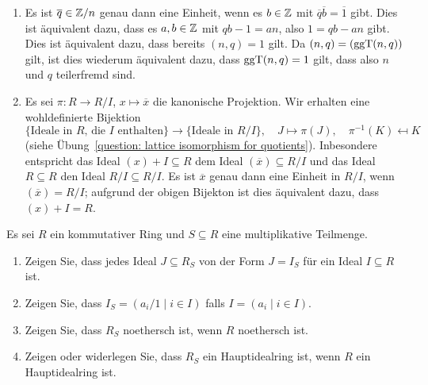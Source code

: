 \begin{solution}
  \begin{enumerate}
    \item 
      Es ist $\overline{q} \in \mathbb{Z}/n$ genau dann eine Einheit, wenn es $b \in \mathbb{Z}$ mit $\overline{q} \overline{b} = \overline{1}$ gibt.
      Dies ist äquivalent dazu, dass es $a, b \in \mathbb{Z}$ mit $qb - 1 = an$, also $1 = qb - an$ gibt.
      Dies ist äquivalent dazu, dass bereits $(n,q) = 1$ gilt.
      Da $(n,q) = (\operatorname{ggT}(n,q))$ gilt, ist dies wiederum äquivalent dazu, dass $\operatorname{ggT}(n,q) = 1$ gilt, dass also $n$ und $q$ teilerfremd sind.
    \item
      Es sei $\pi \colon R \to R/I$, $x \mapsto \overline{x}$ die kanonische Projektion.
      Wir erhalten eine wohldefinierte Bijektion
      \[
              \{\text{Ideale in $R$, die $I$ enthalten}\}
        \to   \{\text{Ideale in $R/I$}\},
        \quad J \mapsto \pi(J),
        \quad \pi^{-1}(K) \mapsfrom K
      \]
      (siehe Übung~\ref{question: lattice isomorphism for quotients}).
      Inbesondere entspricht das Ideal $(x) + I \subseteq R$ dem Ideal $(\overline{x}) \subseteq R/I$ und das Ideal $R \subseteq R$ den Ideal $R/I \subseteq R/I$.
      Es ist $\overline{x}$ genau dann eine Einheit in $R/I$, wenn $(\overline{x}) = R/I$;
      aufgrund der obigen Bijekton ist dies äquivalent dazu, dass $(x) + I = R$.
  \end{enumerate}
\end{solution}


\begin{question}[subtitle = Ideale in der Lokalisierung]
  Es sei $R$ ein kommutativer Ring und $S \subseteq R$ eine multiplikative Teilmenge.
  \begin{enumerate}
    \item
      Zeigen Sie, dass jedes Ideal $J \subseteq R_S$ von der Form $J = I_S$ für ein Ideal $I \subseteq R$ ist.
    \item
      Zeigen Sie, dass $I_S = (a_i/1 \mid i \in I)$ falls $I = (a_i \mid i \in I)$.
    \item
      Zeigen Sie, dass $R_S$ noethersch ist, wenn $R$ noethersch ist.
    \item
      Zeigen oder widerlegen Sie, dass $R_S$ ein Hauptidealring ist, wenn $R$ ein Hauptidealring ist.
  \end{enumerate}
\end{question}


